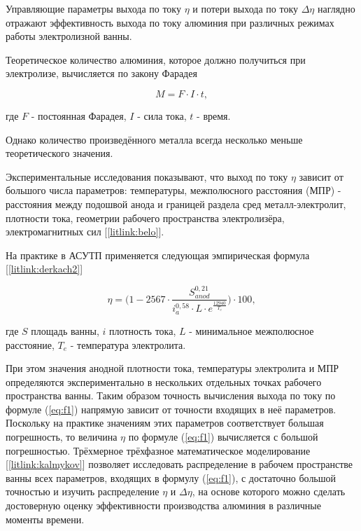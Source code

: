 \documentclass[]{pmi}
\begin{document}

Управляющие параметры выхода по току $\eta$ и потери выхода по току $\Delta \eta$ наглядно отражают эффективность выхода по току алюминия при различных режимах работы электролизной ванны.

Теоретическое количество алюминия, которое должно получиться при электролизе, вычисляется по закону Фарадея

\begin{equation}\label{eq:farad}
M = F \cdot I \cdot t,
\end{equation}

где $F$ - постоянная Фарадея, $I$ - сила тока, $t$ - время.

Однако количество произведённого металла всегда несколько меньше теоретического значения.

Экспериментальные исследования показывают, что выход по току $\eta$ зависит от большого числа параметров: температуры, межполюсного расстояния (МПР) - расстояния между подошвой анода и границей раздела сред металл-электролит, плотности тока, геометрии рабочего пространства электролизёра, электромагнитных сил [\ref{litlink:belo}].

На практике в АСУТП применяется следующая эмпирическая формула [\ref{litlink:derkach2}]

\begin{equation}\label{eq:f1}
\eta = \bigg(1-2567 \cdot \frac{S^{0,21}_{anod}}{i^{0,58}_{a}\cdot L \cdot e^{\frac{12940}{T_e}}}\bigg) \cdot 100,
\end{equation}

где $S$ площадь ванны, $i$ плотность тока, $L$ - минимальное межполюсное расстояние, $T_e$ - температура электролита.

При этом значения анодной плотности тока, температуры электролита и МПР определяются экспериментально в нескольких отдельных точках рабочего пространства ванны.
Таким образом точность вычисления выхода по току по формуле (\ref{eq:f1}) напрямую зависит от точности входящих в неё параметров. Поскольку на практике значениям этих параметров соответствует большая погрешность, то величина $\eta$ по формуле (\ref{eq:f1}) вычисляется с большой погрешностью. Трёхмерное трёхфазное математическое моделирование [\ref{litlink:kalmykov}] позволяет исследовать распределение в рабочем пространстве ванны всех параметров, входящих в формулу (\ref{eq:f1}), с достаточно большой точностью и изучить распределение $\eta$ и $\Delta\eta$, на основе которого можно сделать достоверную оценку эффективности производства алюминия в различные моменты времени.
\end{document}
